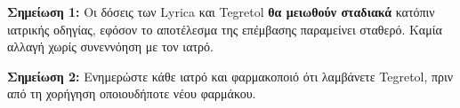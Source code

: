\documentclass[10pt,greek]{article}
\begin{document}
\begin{MedTable}
\end{MedTable}

\textbf{Σημείωση 1:} Οι δόσεις των Lyrica και Tegretol \textbf{θα μειωθούν σταδιακά} κατόπιν ιατρικής οδηγίας, εφόσον το αποτέλεσμα της επέμβασης παραμείνει σταθερό. Καμία αλλαγή χωρίς συνεννόηση με τον ιατρό.

\textbf{Σημείωση 2:} Ενημερώστε κάθε ιατρό και φαρμακοποιό ότι λαμβάνετε Tegretol, πριν από τη χορήγηση οποιουδήποτε νέου φαρμάκου.
\end{document}
